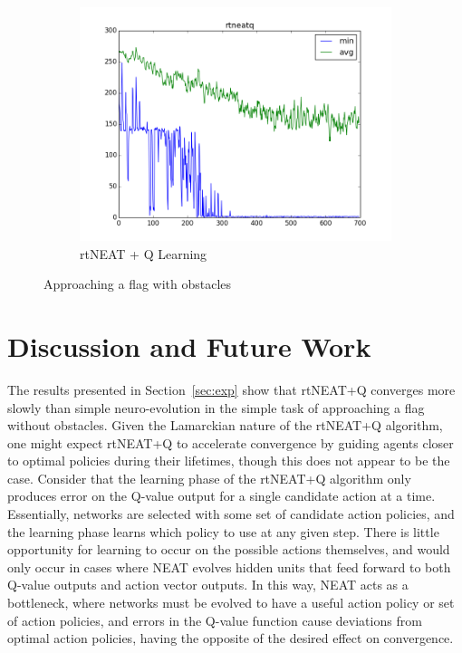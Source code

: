 \documentclass[letterpaper]{article}
\begin{document}
\begin{figure}[ht]
\begin{subfigure}{0.7\columnwidth}
  \includegraphics[width=\columnwidth]{wall_rtneatq.png}
  \caption{rtNEAT + Q Learning}
  \label{fig:wall_neatq}
\end{subfigure}
\caption{Approaching a flag with obstacles}
\label{fig:wall}
\end{figure}

\section{Discussion and Future Work}
The results presented in Section~\ref{sec:exp} show that rtNEAT+Q converges more slowly than simple neuro-evolution in the simple task of approaching a flag without obstacles. Given the Lamarckian nature of the rtNEAT+Q algorithm, one might expect rtNEAT+Q to accelerate convergence by guiding agents closer to optimal policies during their lifetimes, though this does not appear to be the case. Consider that the learning phase of the rtNEAT+Q algorithm only produces error on the Q-value output for a single candidate action at a time. Essentially, networks are selected with some set of candidate action policies, and the learning phase learns which policy to use at any given step. There is little opportunity for learning to occur on the possible actions themselves, and would only occur in cases where NEAT evolves hidden units that feed forward to both Q-value outputs and action vector outputs. In this way, NEAT acts as a bottleneck, where networks must be evolved to have a useful action policy or set of action policies, and errors in the Q-value function cause deviations from optimal action policies, having the opposite of the desired effect on convergence.
\end{document}
